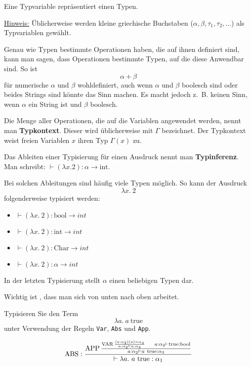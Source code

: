 \begin{definition}[Typvariable]%
	Eine Typvariable repräsentiert einen Typen.
\end{definition}

\underline{Hinweis:} Üblicherweise werden kleine griechische Buchstaben ($\alpha, \beta, \tau_1, \tau_2, \dots$) als Typvariablen gewählt.

Genau wie Typen bestimmte Operationen haben, die auf ihnen definiert sind, 
kann man sagen, dass Operationen bestimmte Typen, auf die diese Anwendbar sind. So ist
\[\alpha+\beta\]
für numerische $\alpha$ und $\beta$ wohldefiniert, auch wenn $\alpha$ und $\beta$ boolesch sind
oder beides Strings sind könnte das Sinn machen. Es macht jedoch z.~B. keinen Sinn,
wenn $\alpha$ ein String ist und $\beta$ boolesch.

Die Menge aller Operationen, die auf die Variablen angewendet werden, nennt man
\textbf{Typkontext}. Dieser wird üblicherweise mit $\Gamma$
bezeichnet. Der Typkontext weist freien Variablen $x$ ihren Typ $\Gamma(x)$ zu.

Das Ableiten einer Typisierung für einen Ausdruck nennt man \textbf{Typinferenz}.
Man schreibt: $\vdash(\lambda x.2): \alpha \rightarrow \text{int}$.

Bei solchen Ableitungen sind häufig viele Typen möglich. So kann der Ausdruck
\[\lambda x.\ 2\]
folgenderweise typisiert werden:
\begin{itemize}
	\item $\vdash(\lambda x.\ 2): \text{bool} \rightarrow int$
	\item $\vdash(\lambda x.\ 2): \text{int} \rightarrow int$
	\item $\vdash(\lambda x.\ 2): \text{Char} \rightarrow int$
	\item $\vdash(\lambda x.\ 2): \alpha \rightarrow int$
\end{itemize}

In der letzten Typisierung stellt $\alpha$ einen beliebigen Typen dar.

Wichtig ist , dass man sich von unten nach oben arbeitet.

\begin{beispiel}
    Typisieren Sie den Term
    \[\lambda a.\ a\ \text{true}\]
    unter Verwendung der Regeln \verb+Var+, \verb+Abs+ und \verb+App+.

    \[\operatorname{ABS}: \frac{\operatorname{APP} \frac{\operatorname{VAR} \frac{(a:\alpha_2)(a) = \alpha_4}{a: \alpha_2 \vdash a: \alpha_4} \;\;\;\;\;\; a: \alpha_2 \vdash \text{true}: \text{bool}}{a: \alpha_2 \vdash a\ \text{true}: \alpha_3}}{\vdash \lambda a.\ a\ \text{true}: \alpha_1}\]
\end{beispiel}

